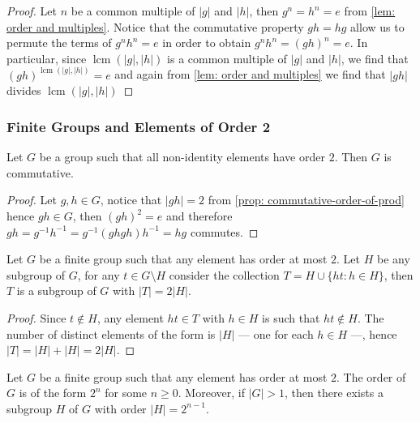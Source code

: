 \begin{proof}
  Let \(n\) be a common multiple of \(|g|\) and \(|h|\), then \(g^n = h^n = e\)
  from \cref{lem: order and multiples}. Notice that the commutative property \(g
  h = h g\) allow us to permute the terms of \(g^n h^n = e\) in order to obtain
  \(g^n h^n = (g h)^n = e\). In particular, since \(\operatorname{lcm}(|g|,
  |h|)\) is a common multiple of \(|g|\) and \(|h|\), we find that \((g
  h)^{\operatorname{lcm}(|g|, |h|)} = e\) and again from \cref{lem: order and
  multiples} we find that \(|g h|\) divides \(\operatorname{lcm}(|g|, |h|)\)
\end{proof}

\subsubsection{Finite Groups and Elements of Order 2}

\begin{lemma}\label{lem: order2-commutes}
  Let \(G\) be a group such that all non-identity elements have order \(2\).
  Then \(G\) is commutative.
\end{lemma}

\begin{proof}
  Let \(g, h \in G\), notice that \(|gh| = 2\) from \cref{prop:
  commutative-order-of-prod} hence \(gh \in G\), then \((gh)^2 = e\) and
  therefore \(gh = g^{-1} h^{-1} = g^{-1}(ghgh)h^{-1} = hg\) commutes.
\end{proof}

\begin{lemma}
  Let \(G\) be a finite group such that any element has order at most \(2\). Let
  \(H\) be any subgroup of \(G\), for any \(t \in G \setminus H\) consider the
  collection \(T = H \cup \{h t : h \in H\}\), then \(T\) is a subgroup of \(G\)
  with \(|T| = 2|H|\).
\end{lemma}

\begin{proof}
  Since \(t \not\in H\), any element \(ht \in T\) with \(h \in H\) is such that
  \(ht \not\in H\). The number of distinct elements of the form is \(|H|\) ---
  one for each \(h \in H\) ---, hence \(|T| = |H| + |H| = 2|H|\).
\end{proof}

\begin{lemma}[Order \(2^n\)]\label{lem: order-2n}
  Let \(G\) be a finite group such that any element has order at most \(2\). The
  order of \(G\) is of the form \(2^n\) for some \(n \geq 0\). Moreover, if
  \(|G| > 1\), then there exists a subgroup \(H\) of \(G\) with order \(|H| =
  2^{n-1}\).
\end{lemma}

